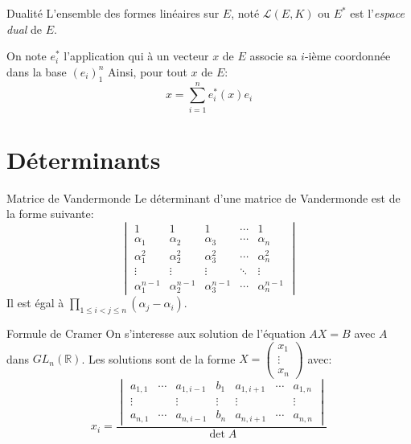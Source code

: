 \documentclass[french, a4paper, 11pt, twocolumn]{article}
\newcommand{\R}{\mathbb{R}}   %
\begin{document}
\begin{theoreme}{Dualité}
  L'ensemble des formes linéaires sur \(E\), noté \(\mathcal L(E, K)\) ou \(E^{*}\) est l'\emph{espace dual} de \(E\).

  On note \(e_{i}^{*}\) l'application qui à un vecteur \(x\) de \(E\) associe sa \(i\)-ième coordonnée dans la base \((e_{i})_{1}^{n}\)
  Ainsi, pour tout \(x\) de \(E\):
  \[x = \sum_{i=1}^n e_{i}^{*}(x)e_{i}\]
\end{theoreme}

\section{Déterminants}
\begin{theoreme}{Matrice de Vandermonde}
  Le déterminant d'une matrice de Vandermonde est de la forme suivante:
  \[\begin{vmatrix}
      1                & 1                & 1                & \cdots & 1              \\
      \alpha_{1}       & \alpha_{2}       & \alpha_{3}       & \cdots & \alpha_{n}     \\
      \alpha_{1}^{2}   & \alpha_{2}^{2}   & \alpha_{3}^{2}   & \cdots & \alpha_{n}^{2} \\
      \vdots           & \vdots           & \vdots           & \ddots & \vdots         \\
      \alpha_{1}^{n-1} & \alpha_{2}^{n-1} & \alpha_{3}^{n-1} & \cdots & \alpha_{n}^{n-1}
    \end{vmatrix}\]
  Il est égal à \(\prod\limits_{1\leqslant i < j \leqslant n}(\alpha_{j}-\alpha_{i})\).
\end{theoreme}

\begin{theoreme}{Formule de Cramer}
  On s'interesse aux solution de l'équation \(AX=B\) avec \(A\) dans \(GL_{n}(\R)\).
  Les solutions sont de la forme \(X = \begin{pmatrix}x_{1}                   \\ \vdots\\ x_{n}\end{pmatrix}\) avec:
  \[x_{i} = \dfrac{
      \begin{vmatrix}
        a_{1,1} & \cdots & a_{1,i-1} & b_{1}  & a_{1,i+1} & \cdots & a_{1,n} \\
        \vdots  &        & \vdots    & \vdots & \vdots    &        & \vdots  \\
        a_{n,1} & \cdots & a_{n,i-1} & b_{n}  & a_{n,i+1} & \cdots & a_{n,n}
      \end{vmatrix}}{\det A}\]
\end{theoreme}
\end{document}
